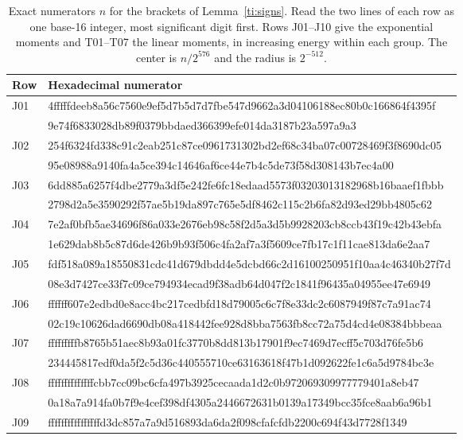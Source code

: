 \begin{table}[htbp]\centering
\caption{Exact numerators \(n\) for the brackets of Lemma~\ref{ti:signs}.
Read the two lines of each row as one base-16 integer, most significant digit first.
Rows J01--J10 give the exponential moments and T01--T07 the linear moments,
in increasing energy within each group. The center is \(n/2^{576}\) and the radius is \(2^{-512}\).}\label{tab:focus-centers}
\small\ttfamily
\begin{tabular}{@{}l@{\quad}l@{}}\toprule
\textrm{Row} & \textrm{Hexadecimal numerator}\\\midrule
J01 & 4fffffdeeb8a56c7560e9ef5d7b5d7d7fbe547d9662a3d04106188ec80b0c166864f4395f\\*
    & 9e74f6833028db89f0379bbdaed366399efe014da3187b23a597a9a3\\[.3ex]
J02 & 254f6324fd338c91c2eab251c87ce0961731302bd2ef68c34ba07c00728469f3f8690dc05\\*
    & 95e08988a9140fa4a5ce394c14646af6ce44e7b4c5de73f58d308143b7ec4a00\\[.3ex]
J03 & 6dd885a6257f4dbe2779a3df5e242fe6fc18edaad5573f03203013182968b16baaef1fbbb\\*
    & 2798d2a5e3590292f57ae5b19da897c765e5df8462c115c2b6fa82d93ed29bb4805c62\\[.3ex]
J04 & 7e2af0bfb5ae34696f86a033e2676eb98c58f2d5a3d5b9928203cb8ccb43f19c42b43ebfa\\*
    & 1e629dab8b5c87d6de426b9b93f506c4fa2af7a3f5609ce7fb17c1f11cae813da6e2aa7\\[.3ex]
J05 & fdf518a089a18550831cdc41d679dbdd4e5dcbd66c2d16100250951f10aa4c46340b27f7d\\*
    & 08e3d7427ce33f7c09ce794934ecad9f38adb64d047f2c1841f96435a04955ee47e6949\\[.3ex]
J06 & ffffff607e2edbd0e8acc4bc217cedbfd18d79005c6c7f8e33dc2c6087949f87c7a91ac74\\*
    & 02c19c10626dad6690db08a418442fee928d8bba7563fb8cc72a75d4cd4e08384bbbeaa\\[.3ex]
J07 & fffffffffb8765b51aec8b93a01fc3770b8dd813b17901f9ec7469d7ecff5c703d76fe5b6\\*
    & 234445817edf0da5f2c5d36c440555710ce63163618f47b1d092622fe1c6a5d9784bc3e\\[.3ex]
J08 & ffffffffffffffcbb7cc09bc6cfa497b3925cecaada1d2c0b972069309977779401a8eb47\\*
    & 0a18a7a914fa0b7f9e4cef398df4305a2446672631b0139a17349bcc35fce8aab6a96b1\\[.3ex]
J09 & ffffffffffffffffd3dc857a7a9d516893da6da2f098cfafcfdb2200c694f43d7728f1349\\*

\end{tabular}
\end{table}
